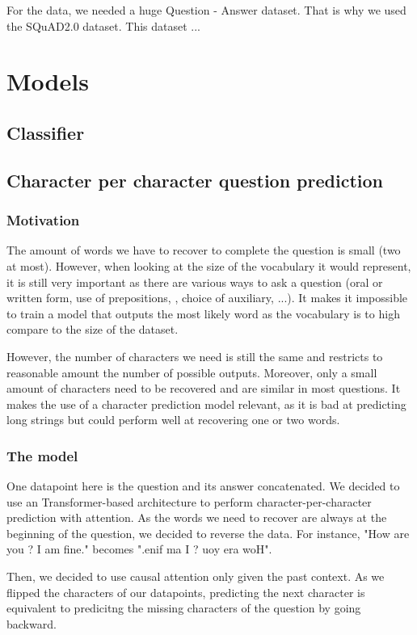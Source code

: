 \documentclass{article}
\begin{document}
For the data, we needed a huge Question - Answer dataset. That is why we used the SQuAD2.0 dataset. This dataset ...

\section{Models}

\subsection{Classifier}

\subsection{Character per character question prediction}

\subsubsection{Motivation}
The amount of words we have to recover to complete the question is small (two at most). However, when looking at the size of the vocabulary it would represent, it is still very important as there are various ways to ask a question (oral or written form, use of prepositions, , choice of auxiliary, ...). It makes it impossible to train a model that outputs the most likely word as the vocabulary is to high compare to the size of the dataset.

However, the number of characters we need is still the same and restricts to reasonable amount the number of possible outputs. Moreover, only a small amount of characters need to be recovered and are similar in most questions. It makes the use of a character prediction model relevant, as it is bad at predicting long strings but could perform well at recovering one or two words.

\subsubsection{The model}
One datapoint here is the question and its answer concatenated.
We decided to use an Transformer-based architecture to perform character-per-character prediction with attention. As the words we need to recover are always at the beginning of the question, we decided to reverse the data. For instance, "How are you ? I am fine." becomes ".enif ma I ? uoy era woH".

Then, we decided to use causal attention only given the past context. As we flipped the characters of our datapoints, predicting the next character is equivalent to predicitng the missing characters of the question by going backward.
\end{document}
